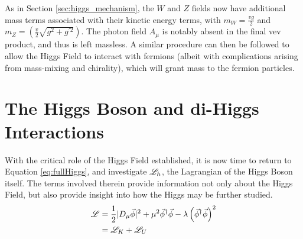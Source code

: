     As in Section \ref{sec:higgs_mechanism}, the $W$ and $Z$ fields now have additional mass terms associated with their kinetic energy terms,
        with $m_W = \frac{vg}{2}$ and $m_Z = \left(\frac{v}{2}\sqrt{g^2 + g^{\prime 2}}\right) $.
    The photon field $A_{\mu}$ is notably absent in the final vev product, and thus is left massless.
    A similar procedure can then be followed to allow the Higgs Field to interact with fermions
        (albeit with complications arising from mass-mixing and chirality), which will grant mass to the fermion particles.




\section{The Higgs Boson and di-Higgs Interactions}

    With the critical role of the Higgs Field established, it is now time to return to Equation \ref{eq:fullHiggs},
        and investigate $\mathscr{L}_h$, the Lagrangian of the Higgs Boson itself.
    The terms involved therein provide information not only about the Higgs Field,
        but also provide insight into how the Higgs may be further studied.
    \begin{equation} \begin{split}
        \mathscr{L} &= \frac{1}{2} |D_{\mu} \vec{\phi}|^2 +
            \mu^2 \vec{\phi}^\dag \vec{\phi} - \lambda \left( \vec{\phi}^\dag\vec{\phi} \right)^2
        \\&= \mathscr{L}_K + \mathscr{L}_U
    \end{split} \end{equation}
    
